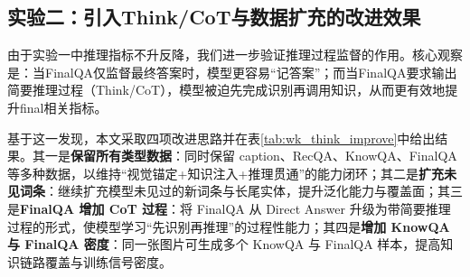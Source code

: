 \begin{table}[htbp]
\centering
\caption{实验一：Part1数据与不同数据类型配置的消融结果（Chinese SimpleVQA）。Rec表示Recognition；Acc表示Accuracy；Part1表示第一批数据；all表示全部类型数据；e表示训练轮次；RKF分别表示RecQA、KnowQA与FinalQA。}
\label{tab:wk_ablation_part1}
\small
\renewcommand{\arraystretch}{1.3}

\end{table}

\subsection{实验二：引入Think/CoT与数据扩充的改进效果}
由于实验一中推理指标不升反降，我们进一步验证推理过程监督的作用。核心观察是：当FinalQA仅监督最终答案时，模型更容易“记答案”；而当FinalQA要求输出简要推理过程（Think/CoT）\citep{wei2022chain}，模型被迫先完成识别再调用知识，从而更有效地提升final相关指标。

基于这一发现，本文采取四项改进思路并在表\ref{tab:wk_think_improve}中给出结果。其一是\textbf{保留所有类型数据}：同时保留 caption、RecQA、KnowQA、FinalQA 等多种数据，以维持“视觉锚定+知识注入+推理贯通”的能力闭环；其二是\textbf{扩充未见词条}：继续扩充模型未见过的新词条与长尾实体，提升泛化能力与覆盖面；其三是\textbf{FinalQA 增加 CoT 过程}：将 FinalQA 从 Direct Answer 升级为带简要推理过程的形式，使模型学习“先识别再推理”的过程性能力；其四是\textbf{增加 KnowQA 与 FinalQA 密度}：同一张图片可生成多个 KnowQA 与 FinalQA 样本，提高知识链路覆盖与训练信号密度。


